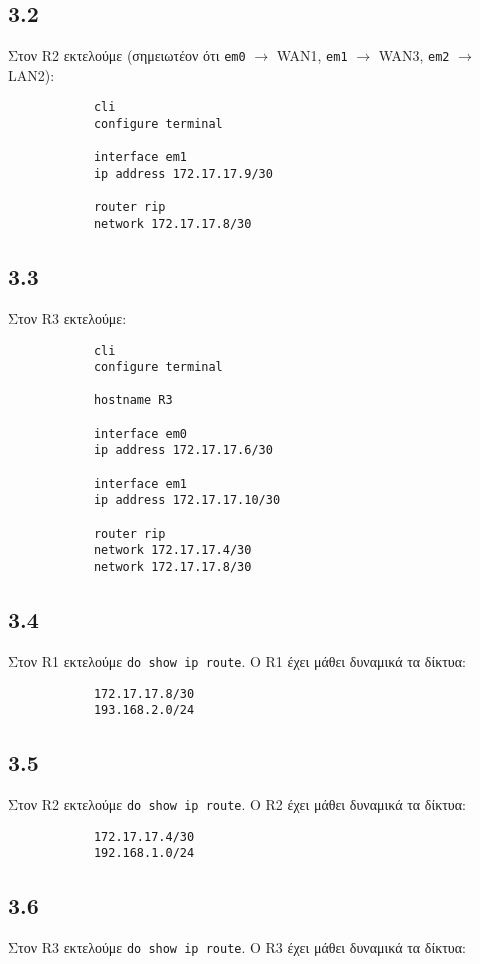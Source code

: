 \documentclass[a4paper, 12pt]{article}
\begin{document}
	\subsection*{3.2}
		Στον R2 εκτελούμε (σημειωτέον ότι \verb|em0| $\rightarrow$ WAN1, \verb|em1| $\rightarrow$ WAN3, \verb|em2| $\rightarrow$ LAN2):
		
		\begin{verbatim}
			cli
			configure terminal
			
			interface em1
			ip address 172.17.17.9/30
			
			router rip
			network 172.17.17.8/30
		\end{verbatim}

	\subsection*{3.3}
		Στον R3 εκτελούμε:
		
		\begin{verbatim}
			cli
			configure terminal
			
			hostname R3
			
			interface em0
			ip address 172.17.17.6/30
			
			interface em1
			ip address 172.17.17.10/30
			
			router rip
			network 172.17.17.4/30
			network 172.17.17.8/30
		\end{verbatim}

	\subsection*{3.4}
		Στον R1 εκτελούμε \verb|do show ip route|. O R1 έχει μάθει δυναμικά τα δίκτυα:
		
		\begin{verbatim}
			172.17.17.8/30
			193.168.2.0/24
		\end{verbatim}

	\subsection*{3.5}
		Στον R2 εκτελούμε \verb|do show ip route|. Ο R2 έχει μάθει δυναμικά τα δίκτυα:
		
		\begin{verbatim}
			172.17.17.4/30
			192.168.1.0/24
		\end{verbatim}

	\subsection*{3.6}
		Στον R3 εκτελούμε \verb|do show ip route|. Ο R3 έχει μάθει δυναμικά τα δίκτυα:
		
\end{document}
